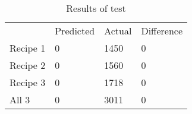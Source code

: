 \begin{table}
    \begin{tabular}{llll}
    ~        & Predicted & Actual & Difference \\
    Recipe 1 & 0         & 1450   & 0          \\
    Recipe 2 & 0         & 1560   & 0          \\
    Recipe 3 & 0         & 1718   & 0          \\
    All 3    & 0         & 3011   & 0          \\
    \end{tabular}
    \caption{Results of test}
\end{table}